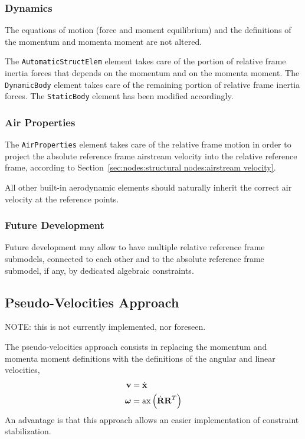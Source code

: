 \documentclass[10pt,dvips,fleqn,subeqn]{report}
\newcommand{\T}[1]{\bm{\mathbf{#1}}}
\newcommand{\TT}[1]{\bm{\mathbf{#1}}}
\begin{document}
\subsubsection{Dynamics}
The equations of motion (force and moment equilibrium)
and the definitions of the momentum and momenta moment are not altered.

The \texttt{AutomaticStructElem} element takes care of the portion
of relative frame inertia forces that depends on the momentum
and on the momenta moment.
The \texttt{DynamicBody} element takes care of the remaining portion
of relative frame inertia forces.
The \texttt{StaticBody} element has been modified accordingly.

\subsubsection{Air Properties}
The \texttt{AirProperties} element takes care of the relative frame motion
in order to project the absolute reference frame airstream velocity
into the relative reference frame,
according to Section~\ref{sec:nodes:structural nodes:airstream velocity}.

All other built-in aerodynamic elements should naturally inherit
the correct air velocity at the reference points.


\subsubsection{Future Development}
Future development may allow to have multiple relative reference frame
submodels, connected to each other and to the absolute reference frame
submodel, if any, by dedicated algebraic constraints.




\subsection{Pseudo-Velocities Approach}
\label{sec:nodes:structural nodes:pseudo-velocities approach}
NOTE: this is not currently implemented, nor foreseen.

The pseudo-velocities approach consists in replacing the momentum
and momenta moment definitions with the definitions of the angular
and linear velocities,
\begin{subequations}
\begin{align}
	\T{v} &= \dot{\T{x}} \\
	\T{\omega} &= \mathrm{ax}\plbr{\dot{\TT{R}} \TT{R}^T}
\end{align}
\end{subequations}
An advantage is that this approach allows an easier implementation
of constraint stabilization.
\end{document}
